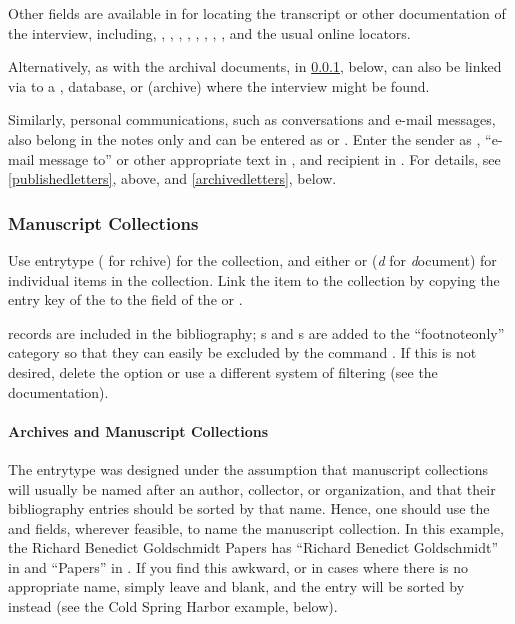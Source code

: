 \documentclass{ltxdockit}[2010/02/12]
\begin{document}
Other fields are available in  for locating the transcript or other documentation of the interview, including, , , , , , , , , and the usual online locators.

Alternatively, as with the archival documents, in \ref{manuscripts}, below,  can also be linked via  to a ,  database, or  (archive) where the interview might be found.

Similarly, personal communications, such as conversations and e-mail messages, also belong in the notes only and can be entered as  or . Enter the sender as , ``e-mail message to'' or other appropriate text in , and recipient in . For details, see \ref{publishedletters}, above, and \ref{archivedletters}, below.

\subsubsection{Manuscript Collections}\label{manuscripts} 
Use entrytype  ( for rchive) for the collection, and either  or  (\emph{d} for \emph{d}ocument) for individual items in the collection. Link the item to the collection by copying the entry key of the  to the  field of the  or .

 records are included in the bibliography; s and s are added to the ``footnoteonly'' category so that they can easily be excluded by the command . If this is not desired, delete the  option or use a different system of filtering (see the  documentation). 

\paragraph{Archives and Manuscript Collections}
The entrytype  was designed under the assumption that manuscript collections will usually be named after an author, collector, or organization, and that their bibliography entries should be sorted by that name. Hence, one should use the  and  fields, wherever feasible, to name the manuscript collection.
In this example, the Richard Benedict Goldschmidt Papers has ``Richard Benedict Goldschmidt'' in  and  ``Papers'' in .\autocites[][]{1904}
If you find this awkward, or in cases where there is no appropriate name, simply leave  and  blank, and the entry will be sorted by  instead (see the Cold Spring Harbor example, below).
\end{document}
